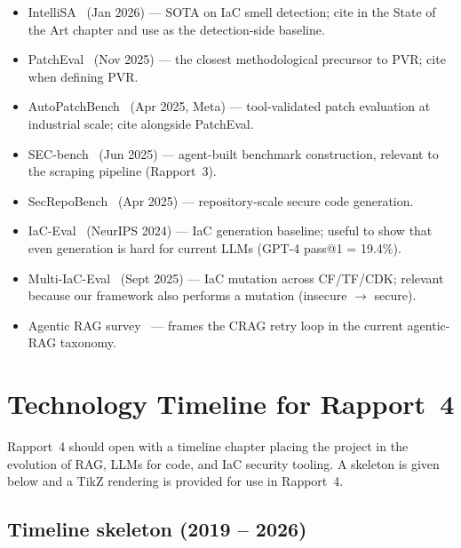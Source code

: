 \documentclass[11pt, a4paper]{report}
\begin{document}
\begin{itemize}
  \item IntelliSA~\citep{intellisa2026} (Jan 2026) --- SOTA on IaC smell
        detection; cite in the State of the Art chapter and use as the
        detection-side baseline.
  \item PatchEval~\citep{lyu2024patcheval} (Nov 2025) --- the closest
        methodological precursor to PVR; cite when defining PVR.
  \item AutoPatchBench~\citep{autopatchbench2025} (Apr 2025, Meta) ---
        tool-validated patch evaluation at industrial scale; cite
        alongside PatchEval.
  \item SEC-bench~\citep{secbench2025} (Jun 2025) --- agent-built
        benchmark construction, relevant to the scraping pipeline
        (Rapport~3).
  \item SecRepoBench~\citep{secrepobench2025} (Apr 2025) ---
        repository-scale secure code generation.
  \item IaC-Eval~\citep{kon2024iaceval} (NeurIPS 2024) --- IaC
        generation baseline; useful to show that even generation is
        hard for current LLMs (GPT-4 pass@1 = 19.4\%).
  \item Multi-IaC-Eval~\citep{multi2025iaceval} (Sept 2025) --- IaC
        mutation across CF/TF/CDK; relevant because our framework also
        performs a mutation (insecure $\to$ secure).
  \item Agentic RAG survey~\citep{agenticrag2025survey} --- frames the
        CRAG retry loop in the current agentic-RAG taxonomy.
\end{itemize}

\chapter{Technology Timeline for Rapport~4}
\label{chap:timeline}

Rapport~4 should open with a timeline chapter placing the project in the
evolution of RAG, LLMs for code, and IaC security tooling. A skeleton is
given below and a TikZ rendering is provided for use in Rapport~4.

\section{Timeline skeleton (2019 -- 2026)}
\end{document}

